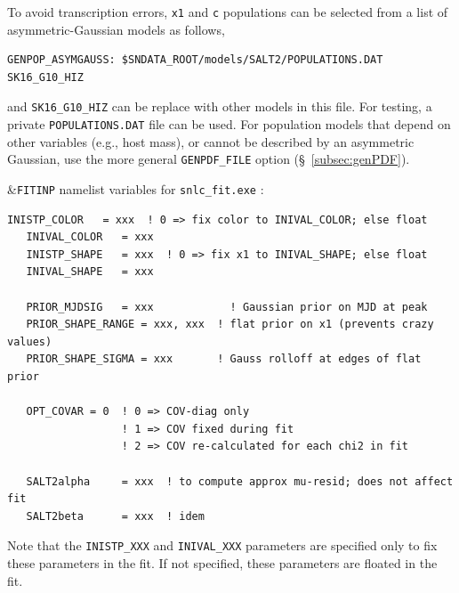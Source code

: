 \documentclass[12pt]{article}
\begin{document}
\bigskip
To avoid transcription errors, {\tt x1} and {\tt c} populations can be
selected from a list of asymmetric-Gaussian models as follows,
\begin{Verbatim}[frame=single]
   GENPOP_ASYMGAUSS: $SNDATA_ROOT/models/SALT2/POPULATIONS.DAT SK16_G10_HIZ
\end{Verbatim}
%
and {\tt SK16\_G10\_HIZ} can be replace with other models in this file.
For testing, a private {\tt POPULATIONS.DAT} file can be used.
For population models that depend on other variables (e.g., host mass),
or cannot be described by an asymmetric Gaussian, 
use the more general {\tt GENPDF\_FILE} option
(\S~\ref{subsec:genPDF}).

\clearpage
\noindent
\&{\tt FITINP} namelist variables  for {\tt snlc\_fit.exe} :
\begin{Verbatim}[frame=single]
   INISTP_COLOR   = xxx  ! 0 => fix color to INIVAL_COLOR; else float
   INIVAL_COLOR   = xxx
   INISTP_SHAPE   = xxx  ! 0 => fix x1 to INIVAL_SHAPE; else float
   INIVAL_SHAPE   = xxx

   PRIOR_MJDSIG   = xxx            ! Gaussian prior on MJD at peak
   PRIOR_SHAPE_RANGE = xxx, xxx  ! flat prior on x1 (prevents crazy values)
   PRIOR_SHAPE_SIGMA = xxx       ! Gauss rolloff at edges of flat prior
   
   OPT_COVAR = 0  ! 0 => COV-diag only 
                  ! 1 => COV fixed during fit
                  ! 2 => COV re-calculated for each chi2 in fit

   SALT2alpha     = xxx  ! to compute approx mu-resid; does not affect fit
   SALT2beta      = xxx  ! idem
\end{Verbatim}
Note that the {\tt INISTP\_XXX} and {\tt INIVAL\_XXX} parameters
are specified only to fix these parameters in the fit. 
If not specified, these parameters are floated in the fit.
\end{document}
